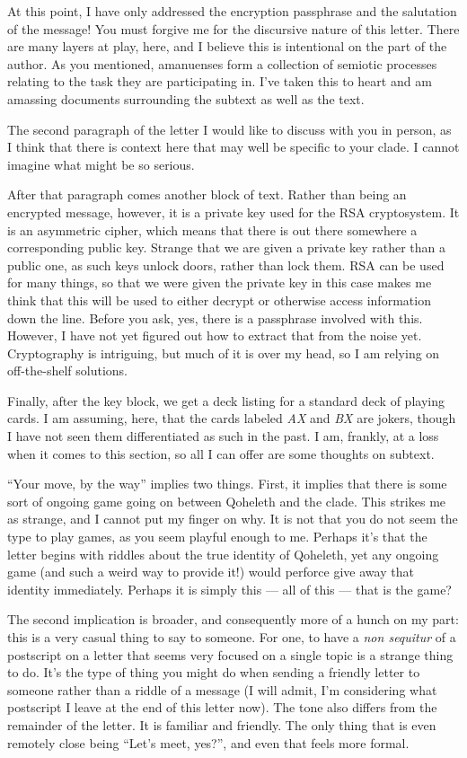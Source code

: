 At this point, I have only addressed the encryption passphrase and the salutation of the message! You must forgive me for the discursive nature of this letter. There are many layers at play, here, and I believe this is intentional on the part of the author. As you mentioned, amanuenses form a collection of semiotic processes relating to the task they are participating in. I've taken this to heart and am amassing documents surrounding the subtext as well as the text.

The second paragraph of the letter I would like to discuss with you in person, as I think that there is context here that may well be specific to your clade. I cannot imagine what might be so serious.

After that paragraph comes another block of text. Rather than being an encrypted message, however, it is a private key used for the RSA cryptosystem. It is an asymmetric cipher, which means that there is out there somewhere a corresponding public key. Strange that we are given a private key rather than a public one, as such keys unlock doors, rather than lock them. RSA can be used for many things, so that we were given the private key in this case makes me think that this will be used to either decrypt or otherwise access information down the line. Before you ask, yes, there is a passphrase involved with this. However, I have not yet figured out how to extract that from the noise yet. Cryptography is intriguing, but much of it is over my head, so I am relying on off-the-shelf solutions.

Finally, after the key block, we get a deck listing for a standard deck of playing cards. I am assuming, here, that the cards labeled \emph{AX} and \emph{BX} are jokers, though I have not seen them differentiated as such in the past. I am, frankly, at a loss when it comes to this section, so all I can offer are some thoughts on subtext.

``Your move, by the way'' implies two things. First, it implies that there is some sort of ongoing game going on between Qoheleth and the clade. This strikes me as strange, and I cannot put my finger on why. It is not that you do not seem the type to play games, as you seem playful enough to me. Perhaps it's that the letter begins with riddles about the true identity of Qoheleth, yet any ongoing game (and such a weird way to provide it!) would perforce give away that identity immediately. Perhaps it is simply this — all of this — that is the game?

The second implication is broader, and consequently more of a hunch on my part: this is a very casual thing to say to someone. For one, to have a \emph{non sequitur} of a postscript on a letter that seems very focused on a single topic is a strange thing to do. It's the type of thing you might do when sending a friendly letter to someone rather than a riddle of a message (I will admit, I'm considering what postscript I leave at the end of this letter now). The tone also differs from the remainder of the letter. It is familiar and friendly. The only thing that is even remotely close being ``Let's meet, yes?'', and even that feels more formal.

